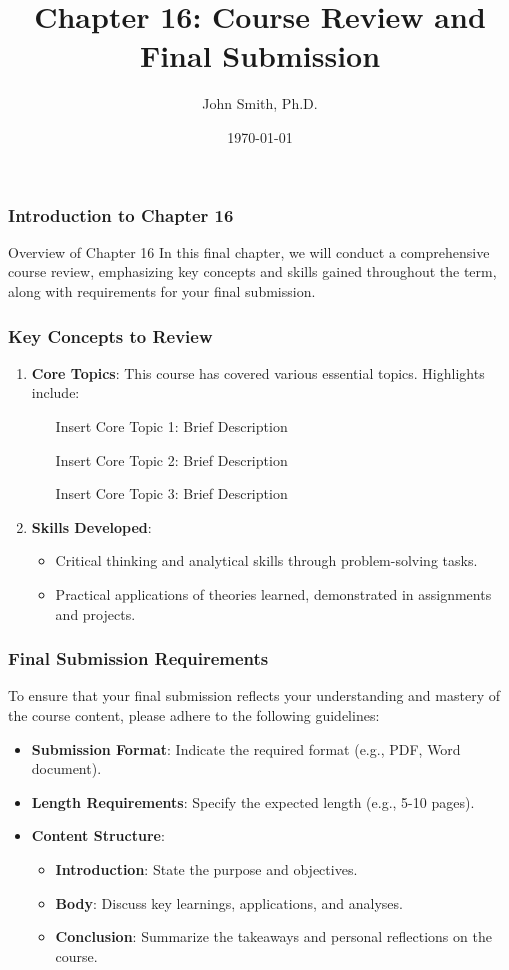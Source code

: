 \documentclass[aspectratio=169]{beamer}
\title[Course Review]{Chapter 16: Course Review and Final Submission}
\author[J. Smith]{John Smith, Ph.D.}
\institute[University Name]{
  Department of Computer Science\\
  University Name\\
  \vspace{0.3cm}
  Email: email@university.edu\\
  Website: www.university.edu
}
\date{\today}
\begin{document}
\frame{\titlepage}

\begin{frame}[fragile]
    \frametitle{Introduction to Chapter 16}
    \begin{block}{Overview of Chapter 16}
        In this final chapter, we will conduct a comprehensive course review, emphasizing key concepts and skills gained throughout the term, along with requirements for your final submission.
    \end{block}
\end{frame}

\begin{frame}[fragile]
    \frametitle{Key Concepts to Review}
    \begin{enumerate}
        \item \textbf{Core Topics}: This course has covered various essential topics. Highlights include:
        \begin{itemize}
            \item [Insert Core Topic 1: Brief Description]
            \item [Insert Core Topic 2: Brief Description]
            \item [Insert Core Topic 3: Brief Description]
        \end{itemize}
        
        \item \textbf{Skills Developed}:
        \begin{itemize}
            \item Critical thinking and analytical skills through problem-solving tasks.
            \item Practical applications of theories learned, demonstrated in assignments and projects.
        \end{itemize}
    \end{enumerate}
\end{frame}

\begin{frame}[fragile]
    \frametitle{Final Submission Requirements}
    To ensure that your final submission reflects your understanding and mastery of the course content, please adhere to the following guidelines:

    \begin{itemize}
        \item \textbf{Submission Format}: Indicate the required format (e.g., PDF, Word document).
        \item \textbf{Length Requirements}: Specify the expected length (e.g., 5-10 pages).
        \item \textbf{Content Structure}:
        \begin{itemize}
            \item \textbf{Introduction}: State the purpose and objectives.
            \item \textbf{Body}: Discuss key learnings, applications, and analyses.
            \item \textbf{Conclusion}: Summarize the takeaways and personal reflections on the course.
        \end{itemize}
    \end{itemize}
\end{frame}
\end{document}
